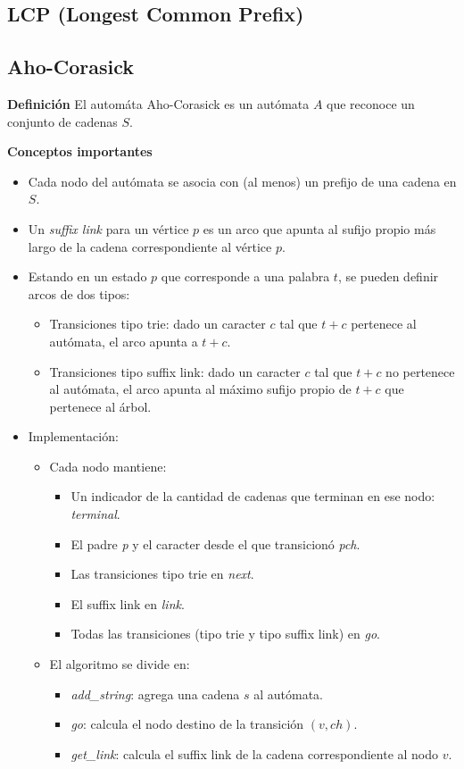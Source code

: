 \subsection{LCP (Longest Common Prefix)}
\subsection{Aho-Corasick}
\textbf{Definición}
El automáta Aho-Corasick es un autómata $A$ que reconoce un conjunto de cadenas $S$.

\textbf{Conceptos importantes}
\begin{itemize}
	\item Cada nodo del autómata se asocia con (al menos) un prefijo de una cadena en $S$.
	\item Un \emph{suffix link} para un vértice $p$ es un arco que apunta al sufijo propio
	más largo de la cadena correspondiente al vértice $p$.
	\item Estando en un estado $p$ que corresponde a una palabra $t$, se pueden definir 
	arcos de dos tipos:
	\begin{itemize}
		\item Transiciones tipo trie: dado un caracter $c$ tal que $t + c$ pertenece al autómata,
		el arco apunta a $t + c$.
		\item Transiciones tipo suffix link: dado un caracter $c$ tal que $t + c$ no pertenece al
		autómata, el arco apunta al máximo sufijo propio de $t + c$ que pertenece al árbol.
	\end{itemize}
	\item Implementación:
	\begin{itemize}
		\item Cada nodo mantiene:
		\begin{itemize} 
			\item Un indicador de la cantidad de cadenas que terminan en ese nodo: \emph{terminal}.
			\item El padre \emph{p} y el caracter desde el que transicionó \emph{pch}.
			\item Las transiciones tipo trie en \emph{next}.
			\item El suffix link en \emph{link}.
			\item Todas las transiciones (tipo trie y tipo suffix link) en \emph{go}.
		\end{itemize}
		\item El algoritmo se divide en:
		\begin{itemize}
			\item \emph{add\_string}: agrega una cadena $s$ al autómata.
			\item \emph{go}: calcula el nodo destino de la transición $(v, ch)$.
			\item \emph{get\_link}: calcula el suffix link de la cadena correspondiente al nodo $v$.
		\end{itemize}
	\end{itemize}
\end{itemize}

